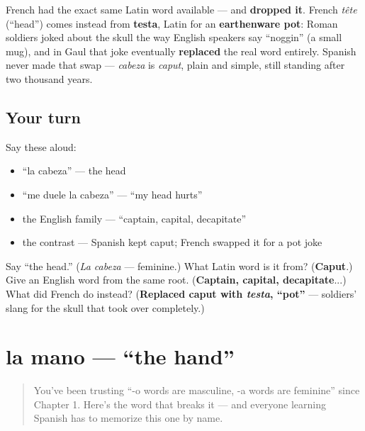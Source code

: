 \begin{culture}
French had the exact same Latin word available — and \textbf{dropped it}. French \emph{tête} (\textquotedblleft{}head\textquotedblright{}) comes instead from \textbf{testa}, Latin for an \textbf{earthenware pot}: Roman soldiers joked about the skull the way English speakers say \textquotedblleft{}noggin\textquotedblright{} (a small mug), and in Gaul that joke eventually \textbf{replaced} the real word entirely. Spanish never made that swap — \emph{cabeza} is \emph{caput}, plain and simple, still standing after two thousand years.
\end{culture}

\subsection*{Your turn}
Say these aloud:

\begin{itemize}
\raggedright
  \item \textquotedblleft{}la cabeza\textquotedblright{} — the head
  \item \textquotedblleft{}me duele la cabeza\textquotedblright{} — \textquotedblleft{}my head hurts\textquotedblright{}
  \item the English family — \textquotedblleft{}captain, capital, decapitate\textquotedblright{}
  \item the contrast — Spanish kept caput; French swapped it for a pot joke
\end{itemize}

\begin{tcolorbox}[breakable,colback=teal!4,colframe=teal!35!black,title={Before you move on}]
Say \textquotedblleft{}the head.\textquotedblright{} (\emph{La cabeza} — feminine.) What Latin word is it from? (\textbf{Caput}.) Give an English word from the same root. (\textbf{Captain, capital, decapitate}...) What did French do instead? (\textbf{Replaced caput with \emph{testa}, \textquotedblleft{}pot\textquotedblright{}} — soldiers' slang for the skull that took over completely.)
\end{tcolorbox}
\section[la mano]{la mano — \textquotedblleft{}the hand\textquotedblright{}}

\label{lesson:ES-C24-mano}



\begin{quote}
You've been trusting \textquotedblleft{}-o words are masculine, -a words are feminine\textquotedblright{} since Chapter 1. Here's the word that breaks it — and everyone learning Spanish has to memorize this one by name.
\end{quote}

